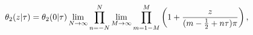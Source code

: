 \[\mathop{\theta_{2}\/}\nolimits\!\left(z\middle|\tau\right)=\mathop{\theta_{2}%
\/}\nolimits\!\left(0\middle|\tau\right)\*\lim_{N\to\infty}\prod_{n=-N}^{N}%
\lim_{M\to\infty}\prod_{m=1-M}^{M}\left(1+\frac{z}{(m-\tfrac{1}{2}+n\tau)\pi}%
\right),\]